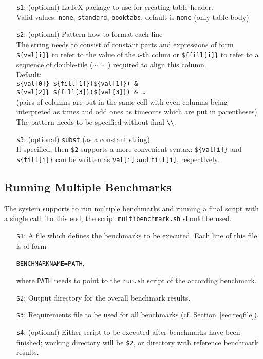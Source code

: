 \documentclass[a4paper]{article}
\begin{document}
			\medskip{}
			\begin{itemize}
				\item[{\tt \$1}:] (optional) \LaTeX{} package to use for creating table header. \\
					Valid values: {\tt none}, {\tt standard}, {\tt booktabs}, default is {\tt none} (only table body)
				\item[{\tt \$2}:] (optional) Pattern how to format each line \\
					The string needs to consist of constant parts and expressions of form
					{\tt \$\{val[i]\}} to refer to the value of the $i$-th colum
					or {\tt \$\{fill[i]\}} to refer to a sequence of double-tile ($\sim\sim$) required to align this column. \\
					Default: \\
					{\tt \$\{val[0]\} \$\{fill[1]\}(\$\{val[1]\}) \& \\
					 \$\{val[2]\} \$\{fill[3]\}(\$\{val[3]\}) \& \ldots} \\
					(pairs of columns are put in the same cell with even columns being interpreted as times
					and odd ones as timeouts which are put in parentheses) \\
					The pattern needs to be specified without final {\tt \textbackslash\textbackslash}.
				\item[{\tt \$3}:] (optional) {\tt subst} (as a constant string) \\
					If specified, then {\tt \$2} supports a more convenient syntax: {\tt \$\{val[i]\}} and {\tt \$\{fill[i]\}} can be written as {\tt val[i]} and {\tt fill[i]}, respectively.
			\end{itemize}

		\subsection{Running Multiple Benchmarks}
		\label{sec:advanced:multiple}
					
			The system supports to run multiple benchmarks and running a final script with a single call.
			To this end, the script {\tt multibenchmark.sh} should be used.

			\medskip{}
			\begin{itemize}
				\item[{\tt \$1}:] A file which defines the benchmarks to be executed.
					Each line of this file is of form
					\begin{center}
						{\tt BENCHMARKNAME=PATH},
					\end{center}
					where {\tt PATH} needs to point to the {\tt run.sh} script of the according benchmark.
				\item[{\tt \$2}:] Output directory for the overall benchmark results.
				\item[{\tt \$3}:] Requirements file to be used for all benchmarks (cf. Section~\ref{sec:reqfile}).
				\item[{\tt \$4}:] (optional) Either script to be executed after benchmarks have been finished; working directory will be {\tt \$2},
				    or directory with reference benchmark results.
			\end{itemize}
			
\end{document}
